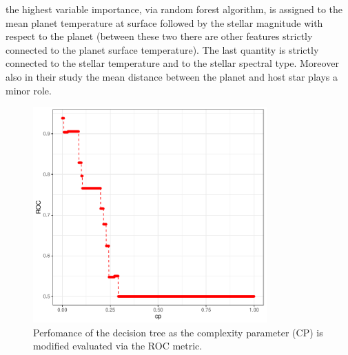\documentclass[
12pt, %
a4paper, %
oneside, %
headinclude,footinclude, %
BCOR5mm, %
]{scrartcl}
\begin{document}
the highest variable importance, via random forest algorithm,  is assigned to the mean planet temperature at surface followed by the stellar magnitude with respect to the planet (between these two there are other features strictly connected to the planet surface temperature). The last quantity is strictly connected to the stellar temperature and to the stellar spectral type. Moreover also in their study the mean distance between the planet and host star plays a minor role.


\begin{figure}[h]
\begin{center}
\includegraphics[width=0.8\textwidth]{Pic/cp_vs_ROC.pdf}
\caption{Perfomance of the decision tree as the complexity parameter (CP) is modified evaluated via the ROC metric. }
\label{cp_vs_ROC}
\end{center}
\end{figure}
\end{document}
